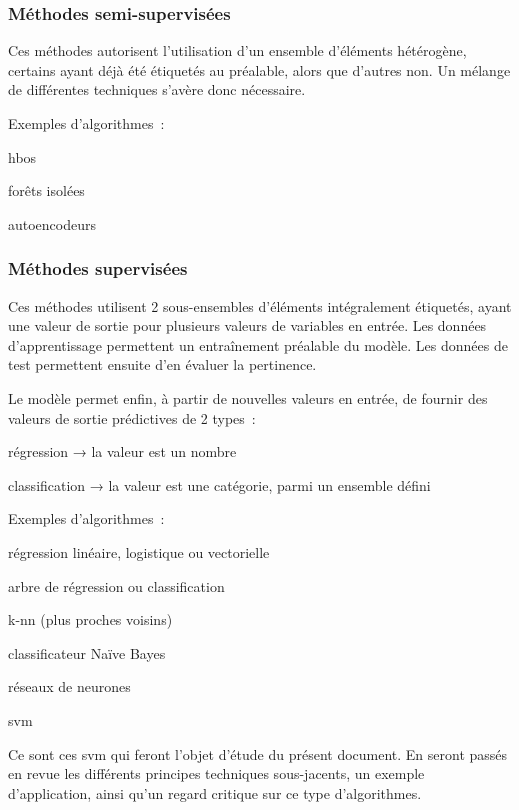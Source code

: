 \subsubsection{Méthodes semi-supervisées}

Ces méthodes autorisent l’utilisation d’un ensemble d’éléments hétérogène,
certains ayant déjà été étiquetés au préalable, alors que d’autres non.
Un mélange de différentes techniques s’avère donc nécessaire.

Exemples d’algorithmes :
\begin{itmz}
\item{\gls{hbos}}
\item{forêts isolées}
\item{autoencodeurs}
\end{itmz}

\subsubsection{Méthodes supervisées}

Ces méthodes utilisent 2 sous-ensembles d’éléments intégralement étiquetés,
ayant une valeur de sortie pour plusieurs valeurs de variables en entrée.
Les données d’apprentissage permettent un entraînement préalable du modèle.
Les données de test permettent ensuite d’en évaluer la pertinence.

Le modèle permet enfin, à partir de nouvelles valeurs en entrée,
de fournir des valeurs de sortie prédictives de 2 types :
\begin{itmz}
\item{régression → la valeur est un nombre}
\item{classification → la valeur est une catégorie, parmi un ensemble défini}
\end{itmz}

Exemples d’algorithmes :
\begin{itmz}
\item{régression linéaire, logistique ou vectorielle}
\item{arbre de régression ou classification}
\item{k-\gls{nn} (plus proches voisins)}
\item{classificateur Naïve Bayes}
\item{réseaux de neurones}
\item{\gls{svm}}
\end{itmz}

Ce sont ces \gls{svm} qui feront l’objet d’étude du présent document.
En seront passés en revue les différents principes techniques sous-jacents,
un exemple d’application, ainsi qu’un regard critique sur ce type d’algorithmes.

\pagebreak
